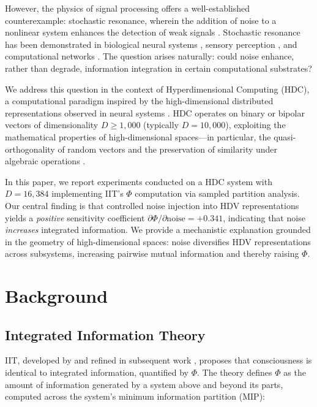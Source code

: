\documentclass[12pt,a4paper]{article}
\begin{document}
However, the physics of signal processing offers a well-established counterexample: stochastic resonance, wherein the addition of noise to a nonlinear system enhances the detection of weak signals \citep{gammaitoni1998stochastic, benzi1981mechanism}. Stochastic resonance has been demonstrated in biological neural systems \citep{moss2004stochastic, mcdonnell2011benefits}, sensory perception \citep{collins1995aperiodic}, and computational networks \citep{stocks2000suprathreshold}. The question arises naturally: could noise enhance, rather than degrade, information integration in certain computational substrates?

We address this question in the context of Hyperdimensional Computing (HDC), a computational paradigm inspired by the high-dimensional distributed representations observed in neural systems \citep{kanerva2009hyperdimensional, plate1995holographic}. HDC operates on binary or bipolar vectors of dimensionality $D \geq 1{,}000$ (typically $D = 10{,}000$), exploiting the mathematical properties of high-dimensional spaces---in particular, the quasi-orthogonality of random vectors and the preservation of similarity under algebraic operations \citep{kanerva2009hyperdimensional}.

In this paper, we report experiments conducted on a HDC system with $D = 16{,}384$ implementing IIT's $\Phi$ computation via sampled partition analysis. Our central finding is that controlled noise injection into HDV representations yields a \emph{positive} sensitivity coefficient $\partial\Phi/\partial\text{noise} = +0.341$, indicating that noise \emph{increases} integrated information. We provide a mechanistic explanation grounded in the geometry of high-dimensional spaces: noise diversifies HDV representations across subsystems, increasing pairwise mutual information and thereby raising $\Phi$.

\section{Background}

\subsection{Integrated Information Theory}

IIT, developed by \citet{tononi2004information} and refined in subsequent work \citep{tononi2008consciousness, oizumi2014phenomenology}, proposes that consciousness is identical to integrated information, quantified by $\Phi$. The theory defines $\Phi$ as the amount of information generated by a system above and beyond its parts, computed across the system's minimum information partition (MIP):
\end{document}
